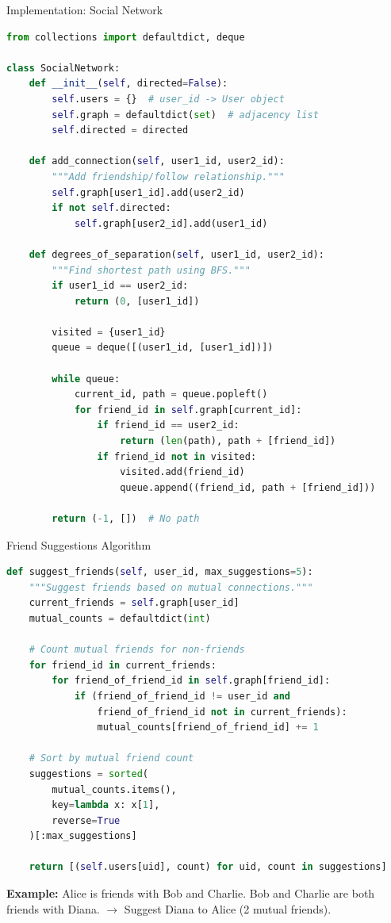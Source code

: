 \documentclass[aspectratio=169,xcolor=dvipsnames]{beamer}
\begin{document}
\begin{frame}[fragile]{Implementation: Social Network}
\begin{lstlisting}[language=Python, basicstyle=\tiny\ttfamily]
from collections import defaultdict, deque

class SocialNetwork:
    def __init__(self, directed=False):
        self.users = {}  # user_id -> User object
        self.graph = defaultdict(set)  # adjacency list
        self.directed = directed

    def add_connection(self, user1_id, user2_id):
        """Add friendship/follow relationship."""
        self.graph[user1_id].add(user2_id)
        if not self.directed:
            self.graph[user2_id].add(user1_id)

    def degrees_of_separation(self, user1_id, user2_id):
        """Find shortest path using BFS."""
        if user1_id == user2_id:
            return (0, [user1_id])

        visited = {user1_id}
        queue = deque([(user1_id, [user1_id])])

        while queue:
            current_id, path = queue.popleft()
            for friend_id in self.graph[current_id]:
                if friend_id == user2_id:
                    return (len(path), path + [friend_id])
                if friend_id not in visited:
                    visited.add(friend_id)
                    queue.append((friend_id, path + [friend_id]))

        return (-1, [])  # No path
\end{lstlisting}
\end{frame}

\begin{frame}[fragile]{Friend Suggestions Algorithm}
\begin{lstlisting}[language=Python, basicstyle=\tiny\ttfamily]
def suggest_friends(self, user_id, max_suggestions=5):
    """Suggest friends based on mutual connections."""
    current_friends = self.graph[user_id]
    mutual_counts = defaultdict(int)

    # Count mutual friends for non-friends
    for friend_id in current_friends:
        for friend_of_friend_id in self.graph[friend_id]:
            if (friend_of_friend_id != user_id and
                friend_of_friend_id not in current_friends):
                mutual_counts[friend_of_friend_id] += 1

    # Sort by mutual friend count
    suggestions = sorted(
        mutual_counts.items(),
        key=lambda x: x[1],
        reverse=True
    )[:max_suggestions]

    return [(self.users[uid], count) for uid, count in suggestions]
\end{lstlisting}

\vspace{0.2cm}
\textbf{Example:} Alice is friends with Bob and Charlie. Bob and Charlie are both friends with Diana. $\to$ Suggest Diana to Alice (2 mutual friends).
\end{frame}
\end{document}
